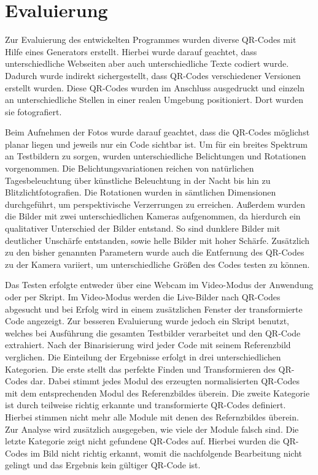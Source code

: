 \documentclass[a4paper, oneside, 12pt]{article}
\begin{document}
\newpage
\section{Evaluierung}
\label{s:evaluierung}

Zur Evaluierung des entwickelten Programmes wurden diverse QR-Codes mit Hilfe eines Generators erstellt. Hierbei wurde darauf geachtet, dass unterschiedliche Webseiten aber auch unterschiedliche Texte codiert wurde. Dadurch wurde indirekt sichergestellt, dass QR-Codes verschiedener Versionen erstellt wurden. Diese QR-Codes wurden im Anschluss ausgedruckt und einzeln an unterschiedliche Stellen in einer realen Umgebung positioniert. Dort wurden sie fotografiert. 

Beim Aufnehmen der Fotos wurde darauf geachtet, dass die QR-Codes möglichst planar liegen und jeweils nur ein Code sichtbar ist. Um für ein breites Spektrum an Testbildern zu sorgen, wurden unterschiedliche Belichtungen und Rotationen vorgenommen. Die Belichtungsvariationen reichen von natürlichen Tagesbeleuchtung über künstliche Beleuchtung in der Nacht bis hin zu Blitzlichtfotografien. Die Rotationen wurden in sämtlichen Dimensionen durchgeführt, um perspektivische Verzerrungen zu erreichen. Außerdem wurden die Bilder mit zwei unterschiedlichen Kameras aufgenommen, da hierdurch ein qualitativer Unterschied der Bilder entstand. So sind dunklere Bilder mit deutlicher Unschärfe entstanden, sowie helle Bilder mit hoher Schärfe. Zusätzlich zu den bisher genannten Parametern wurde auch die Entfernung des QR-Codes zu der Kamera variiert, um unterschiedliche Größen des Codes testen zu können.

Das Testen erfolgte entweder über eine Webcam im Video-Modus der Anwendung oder per Skript. Im Video-Modus werden die Live-Bilder nach QR-Codes abgesucht und bei Erfolg wird in einem zusätzlichen Fenster der transformierte Code angezeigt. Zur besseren Evaluierung wurde jedoch ein Skript benutzt, welches bei Ausführung die gesamten Testbilder verarbeitet und den QR-Code extrahiert. Nach der Binarisierung wird jeder Code mit seinem Referenzbild verglichen. Die Einteilung der Ergebnisse erfolgt in drei unterschiedlichen Kategorien. Die erste stellt das perfekte Finden und Transformieren des QR-Codes dar. Dabei stimmt jedes Modul des erzeugten normalisierten QR-Codes mit dem entsprechenden Modul des Referenzbildes überein. Die zweite Kategorie ist durch teilweise richtig erkannte und transformierte QR-Codes definiert. Hierbei stimmen nicht mehr alle Module mit denen des Refernzbildes überein. Zur Analyse wird zusätzlich ausgegeben, wie viele der Module falsch sind. Die letzte Kategorie zeigt nicht gefundene QR-Codes auf. Hierbei wurden die QR-Codes im Bild nicht richtig erkannt, womit die nachfolgende Bearbeitung nicht gelingt und das Ergebnis kein gültiger QR-Code ist. 
\end{document}

